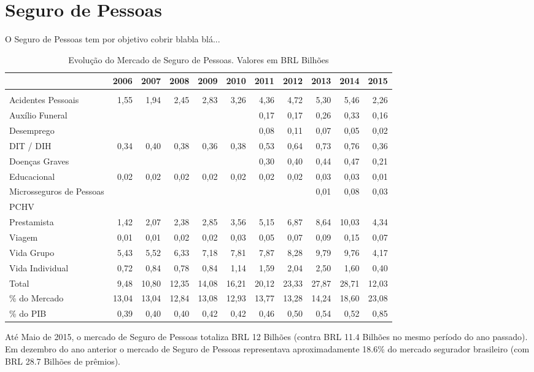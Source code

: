 \documentclass[../../relatorio.tex]{subfiles}
\begin{document}
\section{Seguro de Pessoas}

O Seguro de Pessoas tem por objetivo cobrir blabla blá...


\begin{table}[ht]
\centering
\begin{tabular}{lrrrrrrrrrr}
  \hline
 & 2006 & 2007 & 2008 & 2009 & 2010 & 2011 & 2012 & 2013 & 2014 & 2015 \\ 
  \hline
 &  &  &  &  &  &  &  &  &  &  \\ 
  Acidentes Pessoais & 1,55 & 1,94 & 2,45 & 2,83 & 3,26 & 4,36 & 4,72 & 5,30 & 5,46 & 2,26 \\ 
  Auxílio Funeral &  &  &  &  &  & 0,17 & 0,17 & 0,26 & 0,33 & 0,16 \\ 
  Desemprego &  &  &  &  &  & 0,08 & 0,11 & 0,07 & 0,05 & 0,02 \\ 
  DIT / DIH & 0,34 & 0,40 & 0,38 & 0,36 & 0,38 & 0,53 & 0,64 & 0,73 & 0,76 & 0,36 \\ 
  Doenças Graves &  &  &  &  &  & 0,30 & 0,40 & 0,44 & 0,47 & 0,21 \\ 
  Educacional & 0,02 & 0,02 & 0,02 & 0,02 & 0,02 & 0,02 & 0,02 & 0,03 & 0,03 & 0,01 \\ 
  Microsseguros de Pessoas &  &  &  &  &  &  &  & 0,01 & 0,08 & 0,03 \\ 
  PCHV &  &  &  &  &  &  &  &  &  &  \\ 
  Prestamista & 1,42 & 2,07 & 2,38 & 2,85 & 3,56 & 5,15 & 6,87 & 8,64 & 10,03 & 4,34 \\ 
  Viagem & 0,01 & 0,01 & 0,02 & 0,02 & 0,03 & 0,05 & 0,07 & 0,09 & 0,15 & 0,07 \\ 
  Vida Grupo & 5,43 & 5,52 & 6,33 & 7,18 & 7,81 & 7,87 & 8,28 & 9,79 & 9,76 & 4,17 \\ 
  Vida Individual & 0,72 & 0,84 & 0,78 & 0,84 & 1,14 & 1,59 & 2,04 & 2,50 & 1,60 & 0,40 \\ 
   \hline
Total & 9,48 & 10,80 & 12,35 & 14,08 & 16,21 & 20,12 & 23,33 & 27,87 & 28,71 & 12,03 \\ 
   \hline
\% do Mercado & 13,04 & 13,04 & 12,84 & 13,08 & 12,93 & 13,77 & 13,28 & 14,24 & 18,60 & 23,08 \\ 
   \hline
\% do PIB & 0,39 & 0,40 & 0,40 & 0,42 & 0,42 & 0,46 & 0,50 & 0,54 & 0,52 & 0,85 \\ 
   \hline
\end{tabular}
\caption{Evolução do Mercado de Seguro de Pessoas. Valores em BRL Bilhões} 
\end{table}
Até Maio de 2015, o mercado de Seguro de Pessoas totaliza BRL 12 Bilhões (contra BRL 11.4 Bilhões no mesmo período do ano passado). Em dezembro do ano anterior o mercado de Seguro de Pessoas representava aproximadamente 18.6\% do mercado segurador brasileiro (com BRL 28.7 Bilhões de prêmios).
\end{document}
